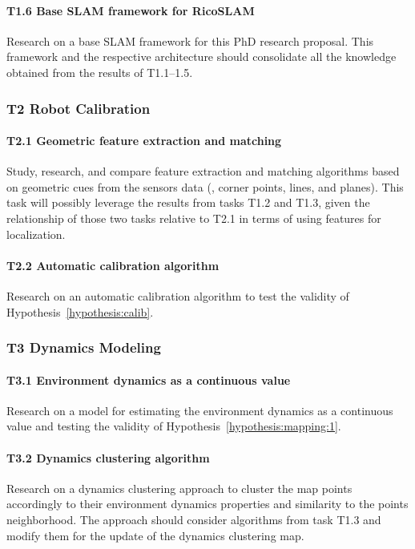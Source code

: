 \paragraph{T1.6 Base \gls{SLAM} framework for RicoSLAM} Research on a base \gls{SLAM} framework for this PhD research proposal. This framework and the respective architecture should consolidate all the knowledge obtained from the results of T1.1--1.5.

\subsubsection*{T2 Robot Calibration}

\paragraph{T2.1 Geometric feature extraction and matching} Study, research, and compare feature extraction and matching algorithms based on geometric cues from the sensors data (\eg, corner points, lines, and planes). This task will possibly leverage the results from tasks T1.2 and T1.3, given the relationship of those two tasks relative to T2.1 in terms of using features for localization.

\paragraph{T2.2 Automatic calibration algorithm} Research on an automatic calibration algorithm to test the validity of Hypothesis~\ref{hypothesis:calib}.

\subsubsection*{T3 Dynamics Modeling}

\paragraph{T3.1 Environment dynamics as a continuous value} Research on a model for estimating the environment dynamics as a continuous value and testing the validity of Hypothesis~\ref{hypothesis:mapping:1}.

\paragraph{T3.2 Dynamics clustering algorithm} Research on a dynamics clustering approach to cluster the map points accordingly to their environment dynamics properties and similarity to the points neighborhood. The approach should consider algorithms from task T1.3 and modify them for the update of the dynamics clustering map.

